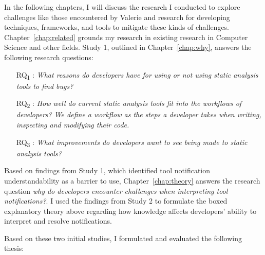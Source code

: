 In the following chapters, I will discuss the research I conducted to explore challenges like those encountered by Valerie and research for developing techniques, frameworks, and tools to mitigate these kinds of challenges.
Chapter~\ref{chap:related} grounds my research in existing research in Computer Science and other fields.
Study 1, outlined in Chapter~\ref{chap:why}, answers the following research questions:
\begin{itemize}
    \item [RQ\textsubscript{1}]: \textit{What reasons do developers have for using or not using static analysis tools to find bugs?}
    \item [RQ\textsubscript{2}]: \textit{How well do current static analysis tools fit into the workflows of developers? We define a workflow as the steps a developer takes when writing, inspecting and modifying their code.}
    \item [RQ\textsubscript{3}]: \textit{What improvements do developers want to see being made to static analysis tools?}
\end{itemize}

Based on findings from Study 1, which identified tool notification understandability as a barrier to use, Chapter~\ref{chap:theory} answers the research question \textit{why do developers encounter challenges when interpreting tool notifications?}.
I used the findings from Study 2 to formulate the boxed explanatory theory above regarding how knowledge affects developers' ability to interpret and resolve notifications.


Based on these two initial studies, I formulated and evaluated the following thesis:

\vspace{0.5em}

\noindent{}

